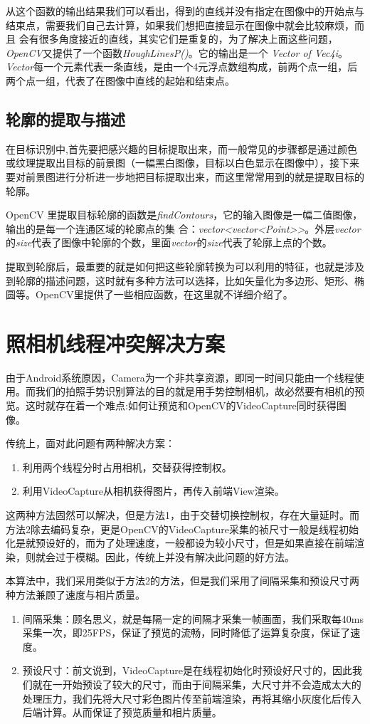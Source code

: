 \documentclass{XDBAthesis}
\begin{document}
   从这个函数的输出结果我们可以看出，得到的直线并没有指定在图像中的开始点与结束点，需要我们自己去计算，如果我们想把直接显示在图像中就会比较麻烦，而且 会有很多角度接近的直线，其实它们是重复的，为了解决上面这些问题，\emph{OpenCV}又提供了一个函数\emph{HoughLinesP()}。它的输出是一个 \emph{Vector of Vec4i}。\emph{Vector}每一个元素代表一条直线，是由一个4元浮点数组构成，前两个点一组，后两个点一组，代表了在图像中直线的起始和结束点。

\subsection{轮廓的提取与描述}

在目标识别中,首先要把感兴趣的目标提取出来，而一般常见的步骤都是通过颜色或纹理提取出目标的前景图（一幅黑白图像，目标以白色显示在图像中），接下来要对前景图进行分析进一步地把目标提取出来，而这里常常用到的就是提取目标的轮廓。

OpenCV 里提取目标轮廓的函数是\emph{findContours}，它的输入图像是一幅二值图像，输出的是每一个连通区域的轮廓点的集 合：\emph{vector<vector<Point>>}。外层\emph{vector}的\emph{size}代表了图像中轮廓的个数，里面\emph{vector}的\emph{size}代表了轮廓上点的个数。

提取到轮廓后，最重要的就是如何把这些轮廓转换为可以利用的特征，也就是涉及到轮廓的描述问题，这时就有多种方法可以选择，比如矢量化为多边形、矩形、椭圆等。OpenCV里提供了一些相应函数，在这里就不详细介绍了。 
\section{照相机线程冲突解决方案}
由于Android系统原因，Camera为一个非共享资源，即同一时间只能由一个线程使用。而我们的拍照手势识别算法的目的就是用手势控制相机，故必然要有相机的预览。这时就存在着一个难点:如何让预览和OpenCV的VideoCapture同时获得图像。

传统上，面对此问题有两种解决方案：
\begin{enumerate}
    \item 利用两个线程分时占用相机，交替获得控制权。
    \item 利用VideoCapture从相机获得图片，再传入前端View渲染。
\end{enumerate}
这两种方法固然可以解决，但是方法1，由于交替切换控制权，存在大量延时。而方法2除去编码复杂，更是OpenCV的VideoCapture采集的祯尺寸一般是线程初始化是就预设好的，而为了处理速度，一般都设为较小尺寸，但是如果直接在前端渲染，则就会过于模糊。因此，传统上并没有解决此问题的好方法。

本算法中，我们采用类似于方法2的方法，但是我们采用了间隔采集和预设尺寸两种方法兼顾了速度与相片质量。
\begin{enumerate}
    \item 间隔采集：顾名思义，就是每隔一定的间隔才采集一帧画面，我们采取每40ms采集一次，即25FPS，保证了预览的流畅，同时降低了运算复杂度，保证了速度。
    \item 预设尺寸：前文说到，VideoCapture是在线程初始化时预设好尺寸的，因此我们就在一开始预设了较大的尺寸，而由于间隔采集，大尺寸并不会造成太大的处理压力，我们先将大尺寸彩色图片传至前端渲染，再将其缩小灰度化后传入后端计算。从而保证了预览质量和相片质量。
\end{enumerate}
\end{document}
